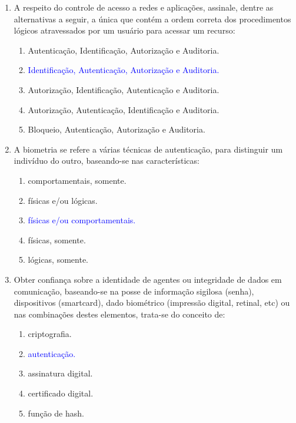 \documentclass{report}
\begin{document}
\begin{enumerate}
		\item A respeito do controle de acesso a redes e aplicações, assinale, dentre as alternativas a seguir, a única que contém a ordem correta dos procedimentos lógicos atravessados por um usuário para acessar um recurso:
		\begin{enumerate}[label=(\alph*)]
			\item Autenticação, Identificação, Autorização e Auditoria.
			\item \textcolor{blue}{Identificação, Autenticação, Autorização e Auditoria.}
			\item Autorização, Identificação, Autenticação e Auditoria.
			\item Autorização, Autenticação, Identificação e Auditoria.
			\item Bloqueio, Autenticação, Autorização e Auditoria.
		\end{enumerate}
		
		\item A biometria se refere a várias técnicas de autenticação, para distinguir um indivíduo do outro, baseando-se nas características:
		\begin{enumerate}[label=(\alph*)]
			\item comportamentais, somente.
			\item físicas e/ou lógicas.
			\item \textcolor{blue}{físicas e/ou comportamentais.}
			\item físicas, somente.
			\item lógicas, somente.
		\end{enumerate}
		
		\item Obter confiança sobre a identidade de agentes ou integridade de dados em comunicação, baseando-se na posse de informação sigilosa (senha), dispositivos (smartcard), dado biométrico (impressão digital, retinal, etc) ou nas combinações destes elementos, trata-se do conceito de:
		\begin{enumerate}[label=(\alph*)]
			\item criptografia.
			\item \textcolor{blue}{autenticação.}
			\item assinatura digital.
			\item certificado digital.
			\item função de hash.
		\end{enumerate}
		

\end{enumerate}
\end{document}
